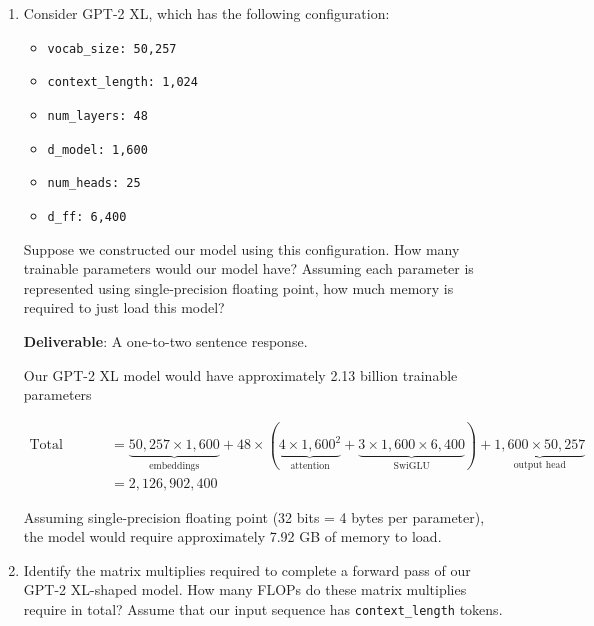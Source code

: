 \begin{enumerate}[label=(\alph*)]
    \item Consider GPT-2 XL, which has the following configuration:
    \begin{itemize}
        \item \lstinline{vocab_size: 50,257}
        \item \lstinline{context_length: 1,024}
        \item \lstinline{num_layers: 48}
        \item \lstinline{d_model: 1,600}
        \item \lstinline{num_heads: 25}
        \item \lstinline{d_ff: 6,400}
    \end{itemize}
    
    Suppose we constructed our model using this configuration. How many trainable parameters would our model have? Assuming each parameter is represented using single-precision floating point, how much memory is required to just load this model?
    
    \textbf{Deliverable}: A one-to-two sentence response.
    
    \begin{answer}
    Our GPT-2 XL model would have approximately 2.13 billion trainable parameters 
    
    \begin{equation*}
    \begin{aligned}
        \text{Total Parameters} &= \underbrace{50,257 \times 1,600}_{\text{embeddings}} + 48 \times (\underbrace{4 \times 1,600^2}_{\text{attention}} + \underbrace{3 \times 1,600 \times 6,400}_{\text{SwiGLU}}) + \underbrace{1,600 \times 50,257}_{\text{output head}}\\
        &= 2,126,902,400
    \end{aligned}
    \end{equation*}

    Assuming single-precision floating point (32 bits = 4 bytes per parameter), the model would require approximately 7.92 GB of memory to load.
    \end{answer}
    
    \item Identify the matrix multiplies required to complete a forward pass of our GPT-2 XL-shaped model. How many FLOPs do these matrix multiplies require in total? Assume that our input sequence has \lstinline{context_length} tokens.
    

\end{enumerate}
